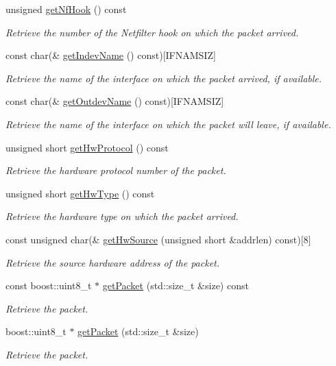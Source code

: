 \begin{DoxyCompactItemize}
unsigned \hyperlink{classIPQ_1_1IpqPacket_ae13884fedce165702f4b71e0e4d93c0b}{get\-Nf\-Hook} () const 
\begin{DoxyCompactList}\small\item\em \-Retrieve the number of the \-Netfilter hook on which the packet arrived. \end{DoxyCompactList}\item 
const char(\& \hyperlink{classIPQ_1_1IpqPacket_a4cf04ca5da28410f27d87edefd679532}{get\-Indev\-Name} () const)\mbox{[}\-I\-F\-N\-A\-M\-S\-I\-Z\mbox{]}
\begin{DoxyCompactList}\small\item\em \-Retrieve the name of the interface on which the packet arrived, if available. \end{DoxyCompactList}\item 
const char(\& \hyperlink{classIPQ_1_1IpqPacket_a46dced8057de3bba7abfaaa63d7afcd4}{get\-Outdev\-Name} () const)\mbox{[}\-I\-F\-N\-A\-M\-S\-I\-Z\mbox{]}
\begin{DoxyCompactList}\small\item\em \-Retrieve the name of the interface on which the packet will leave, if available. \end{DoxyCompactList}\item 
unsigned short \hyperlink{classIPQ_1_1IpqPacket_ae150e294f043f4c699231a85d3b1ae0f}{get\-Hw\-Protocol} () const 
\begin{DoxyCompactList}\small\item\em \-Retrieve the hardware protocol number of the packet. \end{DoxyCompactList}\item 
unsigned short \hyperlink{classIPQ_1_1IpqPacket_ab6b76b146111c7ad11b96e87efe6634c}{get\-Hw\-Type} () const 
\begin{DoxyCompactList}\small\item\em \-Retrieve the hardware type on which the packet arrived. \end{DoxyCompactList}\item 
const unsigned char(\& \hyperlink{classIPQ_1_1IpqPacket_a8582ae732d6b66ca1f5201994159a84a}{get\-Hw\-Source} (unsigned short \&addrlen) const)\mbox{[}8\mbox{]}
\begin{DoxyCompactList}\small\item\em \-Retrieve the source hardware address of the packet. \end{DoxyCompactList}\item 
const boost\-::uint8\-\_\-t $\ast$ \hyperlink{classIPQ_1_1IpqPacket_a6dd7baeec66082658d882bff8862eb6c}{get\-Packet} (std\-::size\-\_\-t \&size) const 
\begin{DoxyCompactList}\small\item\em \-Retrieve the packet. \end{DoxyCompactList}\item 
boost\-::uint8\-\_\-t $\ast$ \hyperlink{classIPQ_1_1IpqPacket_a0bf3344a9eed5e2f6bc20890ffffe26e}{get\-Packet} (std\-::size\-\_\-t \&size)
\begin{DoxyCompactList}\small\item\em \-Retrieve the packet. \end{DoxyCompactList}\end{DoxyCompactItemize}
